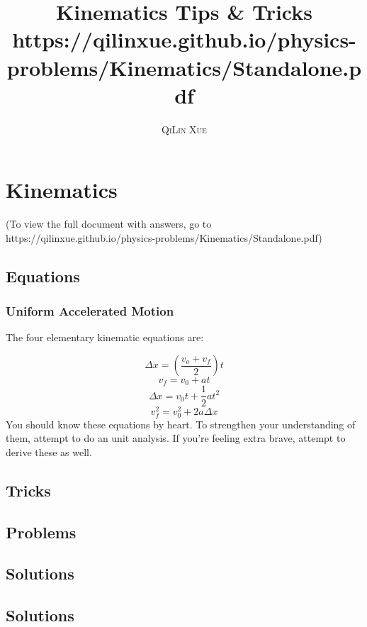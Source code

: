 \documentclass[a4paper,11pt,oneside]{book}
\title{\Huge \textbf{Kinematics Tips \& Tricks} \\ \huge https://qilinxue.github.io/physics-problems/Kinematics/Standalone.pdf}
\author{\textsc{QiLin Xue}}
\begin{document}
\maketitle
\tableofcontents

\chapter{Kinematics}
(To view the full document with answers, go to https://qilinxue.github.io/physics-problems/Kinematics/Standalone.pdf)



\section{Equations}
\subsection{Uniform Accelerated Motion}
The four elementary kinematic equations are:

	\begin{equation}\Delta x = (\frac{v_o + v_f}{2})t\end{equation}
	\begin{equation}v_f = v_0 + at\end{equation}
	\begin{equation}\Delta x = v_0t + \frac{1}{2}at^2\end{equation}
	\begin{equation}v_f^2 = v_0^2 + 2a\Delta x\end{equation}
You should know these equations by heart. To strengthen your understanding of them, attempt to do an unit analysis. If you're feeling extra brave, attempt to derive these as well.


\section{Tricks}


\newpage
\section{Problems}


\newpage
\section{Solutions}
\printsolutions[chapter]

\newpage
\section{Solutions}
\printsolutions[chapter]
\end{document}
